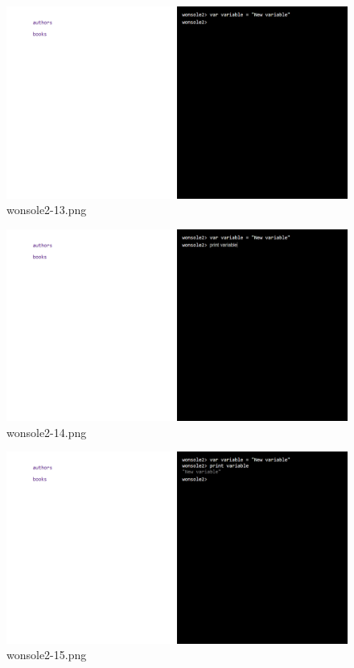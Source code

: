 \clearpage
\begin{figure}
\includegraphics[width=\textwidth]{screenshot/wonsole2/wonsole2-13.png}
\caption{wonsole2-13.png}
\label{wonsole2-13.png}
\end{figure}


\begin{figure}
\includegraphics[width=\textwidth]{screenshot/wonsole2/wonsole2-14.png}
\caption{wonsole2-14.png}
\label{wonsole2-14.png}
\end{figure}


\clearpage
\begin{figure}
\includegraphics[width=\textwidth]{screenshot/wonsole2/wonsole2-15.png}
\caption{wonsole2-15.png}
\label{wonsole2-15.png}
\end{figure}


